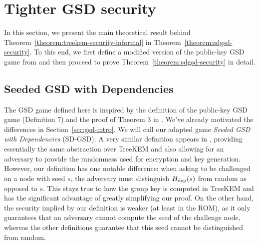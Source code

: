 \section{Tighter GSD security} \label{sec:tighter-gsd-security}

In this section, we present the main theoretical result behind Theorem~\ref{theorem:treekem-security-informal} in Theorem~\ref{theorem:sdgsd-security}. To this end, we first define a modified version of the public-key GSD game from \cite{ttkem} and then proceed to prove Theorem~\ref{theorem:sdgsd-security} in detail.

\subsection{Seeded GSD with Dependencies} \label{sec:sd-gsd-game}


The GSD game defined here is inspired by the definition of the public-key GSD game (Definition 7) and the proof of Theorem 3 in \cite{ttkem}. We've already motivated the differences in Section~\ref{sec:gsd-intro}. We will call our adapted game \emph{Seeded GSD with Dependencies} (SD-GSD). A very similar definition appears in \cite{modular-group-messaging}, providing essentially the same abstraction over TreeKEM and also allowing for an adversary to provide the randomness used for encryption and key generation. However, our definition has one notable difference: when asking to be challenged on a node with seed $s$, the adversary must distinguish $H_\mathrm{dep}(s)$ from random as opposed to $s$. This stays true to how the group key is computed in TreeKEM and has the significant advantage of greatly simplifying our proof. On the other hand, the security implied by our definition is weaker (at least in the ROM), as it only guarantees that an adversary cannot compute the seed of the challenge node, whereas the other definitions guarantee that this seed cannot be distinguished from random.

